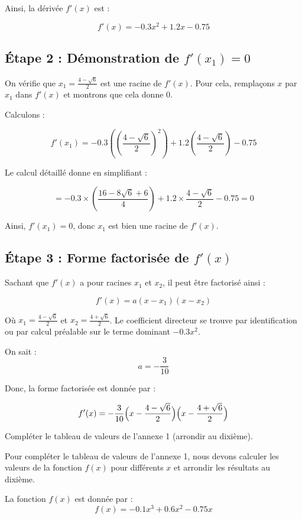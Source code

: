 \documentclass[answers]{exam}
\begin{document}
\begin{questions}
\begin{solution}
Ainsi, la dérivée $f'(x)$ est :

\[
f'(x) = -0.3x^{2} + 1.2x - 0.75
\]

\subsection*{Étape 2 : Démonstration de $f'(x_1) = 0$}

On vérifie que $x_1 = \frac{4-\sqrt{6}}{2}$ est une racine de $f'(x)$. Pour cela, remplaçons $x$ par $x_1$ dans $f'(x)$ et montrons que cela donne 0.

Calculons :

\[
f'(x_1) = -0.3\left(\left(\frac{4-\sqrt{6}}{2}\right)^2\right) + 1.2\left(\frac{4-\sqrt{6}}{2}\right) - 0.75
\]

Le calcul détaillé donne en simplifiant :

\[
= -0.3 \times \left(\frac{16 - 8\sqrt{6} + 6}{4}\right) + 1.2 \times \frac{4-\sqrt{6}}{2} - 0.75 = 0
\]

Ainsi, $f'(x_1) = 0$, donc $x_1$ est bien une racine de $f'(x)$.

\subsection*{Étape 3 : Forme factorisée de $f'(x)$}

Sachant que $f'(x)$ a pour racines $x_1$ et $x_2$, il peut être factorisé ainsi :

\[
f'(x) = a(x - x_1)(x - x_2)
\]

Où $x_1 = \frac{4-\sqrt{6}}{2}$ et $x_2 = \frac{4+\sqrt{6}}{2}$. Le coefficient directeur se trouve par identification ou par calcul préalable sur le terme dominant $-0.3x^2$.

On sait :
\[
a = -\frac{3}{10}
\]

Donc, la forme factorisée est donnée par :

\[
f'(x) = -\frac{3}{10} \Bigl(x - \frac{4-\sqrt{6}}{2}\Bigr) \Bigl(x - \frac{4+\sqrt{6}}{2}\Bigr)
\]

\end{solution}

\question[2] Compléter le tableau de valeurs de l’annexe 1 (arrondir au dixième).


\begin{solution}
Pour compléter le tableau de valeurs de l’annexe 1, nous devons calculer les valeurs de la fonction $f(x)$ pour différents $x$ et arrondir les résultats au dixième.

La fonction $f(x)$ est donnée par :
\[
f(x) = -0.1x^{3} + 0.6x^{2} - 0.75x
\]


\end{solution}
\end{questions}
\end{document}
